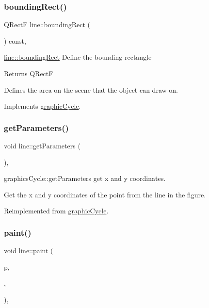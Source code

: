 \subsubsection{\texorpdfstring{bounding\+Rect()}{boundingRect()}}
{\footnotesize\ttfamily Q\+RectF line\+::bounding\+Rect (\begin{DoxyParamCaption}{ }\end{DoxyParamCaption}) const\hspace{0.3cm}{\ttfamily [override]}, {\ttfamily [virtual]}}



\mbox{\hyperlink{classline_a025bc6bd205ea62d0c065acba70e2b97}{line\+::bounding\+Rect}} Define the bounding rectangle 

\begin{DoxyReturn}{Returns}
Q\+RectF
\end{DoxyReturn}
Defines the area on the scene that the object can draw on. 

Implements \mbox{\hyperlink{classgraphic_cycle}{graphic\+Cycle}}.

\mbox{\label{classline_a6453a1483e1cf2ae4f565fd7f80516fc}} 
\subsubsection{\texorpdfstring{get\+Parameters()}{getParameters()}}
{\footnotesize\ttfamily void line\+::get\+Parameters (\begin{DoxyParamCaption}{ }\end{DoxyParamCaption})\hspace{0.3cm}{\ttfamily [override]}, {\ttfamily [virtual]}}



graphics\+Cycle\+::get\+Parameters get x and y coordinates. 

Get the x and y coordinates of the point from the line in the figure. 

Reimplemented from \mbox{\hyperlink{classgraphic_cycle_ac589011ca82a6c2ab648ed4b9fb1632f}{graphic\+Cycle}}.

\mbox{\label{classline_a5607ea98a22c8625342ad71d17043e1b}} 
\subsubsection{\texorpdfstring{paint()}{paint()}}
{\footnotesize\ttfamily void line\+::paint (\begin{DoxyParamCaption}\item[{Q\+Painter $\ast$}]{p,  }\item[{const Q\+Style\+Option\+Graphics\+Item $\ast$}]{,  }\item[{Q\+Widget $\ast$}]{ }\end{DoxyParamCaption})\hspace{0.3cm}{\ttfamily [override]}, {\ttfamily [virtual]}}



